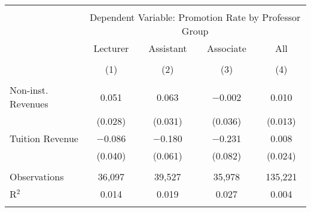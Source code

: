 
\begin{tabular}{@{\extracolsep{5pt}}lcccc} 
\\[-1.8ex]\hline 
\hline \\[-1.8ex] 
 & \multicolumn{4}{c}{Dependent Variable: Promotion Rate by Professor Group} \\ 
\cline{2-5} 
 & Lecturer & Assistant & Associate & All \\ 
\\[-1.8ex] & (1) & (2) & (3) & (4)\\ 
\hline \\[-1.8ex] 
 Non-inst. Revenues & 0.051 & 0.063 & $-$0.002 & 0.010 \\ 
  & (0.028) & (0.031) & (0.036) & (0.013) \\ 
  Tuition Revenue & $-$0.086 & $-$0.180 & $-$0.231 & 0.008 \\ 
  & (0.040) & (0.061) & (0.082) & (0.024) \\ 
 \hline \\[-1.8ex] 
Observations & 36,097 & 39,527 & 35,978 & 135,221 \\ 
R$^{2}$ & 0.014 & 0.019 & 0.027 & 0.004 \\ 
\hline 
\hline \\[-1.8ex] 
\end{tabular} 

